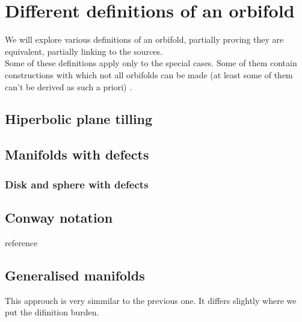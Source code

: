 \chapter{Different definitions of an orbifold}

We will explore various definitions of an orbifold, partially proving they are equivalent, partially 
linking to the sources. \\
Some of these definitions apply only to the special cases. Some of them contain constructions 
with which not all orbifolds can be made (at least some of them can't be derived as such a priori)
. \\

\section{Hiperbolic plane tilling}

\section{Manifolds with defects}
\subsection{Disk and sphere with defects}

\section{Conway notation}
reference 

\section{Generalised manifolds}
This approuch is very simmilar to the previous one. It differs slightly where we put the 
difinition burden. 



